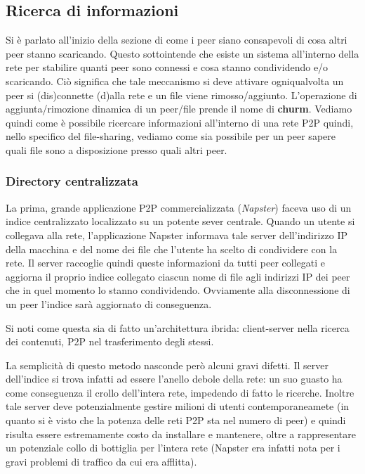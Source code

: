 \subsection{Ricerca di informazioni}\label{ricerca-di-informazioni}

Si è parlato all'inizio della sezione di come i peer siano consapevoli
di cosa altri peer stanno scaricando. Questo sottointende che esiste un
sistema all'interno della rete per stabilire quanti peer sono connessi e
cosa stanno condividendo e/o scaricando. Ciò significa che tale
meccanismo si deve attivare ogniqualvolta un peer si (dis)connette
(d)alla rete e un file viene rimosso/aggiunto. L'operazione di
aggiunta/rimozione dinamica di un peer/file prende il nome di
\textbf{churm}. Vediamo quindi come è possibile ricercare informazioni
all'interno di una rete P2P quindi, nello specifico del file-sharing,
vediamo come sia possibile per un peer sapere quali file sono a
disposizione presso quali altri peer.

\subsubsection{Directory centralizzata}\label{directory-centralizzata}

La prima, grande applicazione P2P commercializzata (\emph{Napster})
faceva uso di un indice centralizzato localizzato su un potente sever
centrale. Quando un utente si collegava alla rete, l'applicazione
Napster informava tale server dell'indirizzo IP della macchina e del
nome dei file che l'utente ha scelto di condividere con la rete. Il
server raccoglie quindi queste informazioni da tutti peer collegati e
aggiorna il proprio indice collegato ciascun nome di file agli indirizzi
IP dei peer che in quel momento lo stanno condividendo. Ovviamente alla
disconnessione di un peer l'indice sarà aggiornato di conseguenza.

Si noti come questa sia di fatto un'architettura ibrida: client-server
nella ricerca dei contenuti, P2P nel trasferimento degli stessi.

La semplicità di questo metodo nasconde però alcuni gravi difetti. Il
server dell'indice si trova infatti ad essere l'anello debole della
rete: un suo guasto ha come conseguenza il crollo dell'intera rete,
impedendo di fatto le ricerche. Inoltre tale server deve potenzialmente
gestire milioni di utenti contemporaneamete (in quanto si è visto che la
potenza delle reti P2P sta nel numero di peer) e quindi risulta essere
estremamente costo da installare e mantenere, oltre a rappresentare un
potenziale collo di bottiglia per l'intera rete (Napster era infatti
nota per i gravi problemi di traffico da cui era afflitta).

